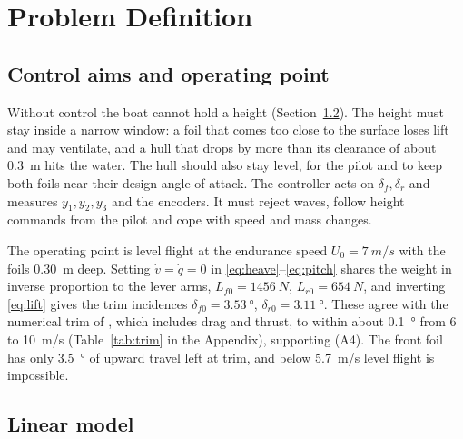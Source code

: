 \documentclass[conference]{IEEEtran}
\begin{document}
\section{Problem Definition}
\label{sec:problem}

\subsection{Control aims and operating point}

Without control the boat cannot hold a height (Section~\ref{sec:lin}). The
height must stay inside a narrow window: a foil that comes too close to the
surface loses lift and may ventilate, and a hull that drops by more than its
clearance of about \SI{0.3}{m} hits the water. The hull should also stay level,
for the pilot and to keep both foils near their design angle of attack. The
controller acts on $\delta_f,\delta_r$ and measures $y_1,y_2,y_3$ and the
encoders. It must reject waves, follow height commands from the pilot and cope
with speed and mass changes.

The operating point is level flight at the endurance speed $U_0=\SI{7}{m/s}$
\cite{belime} with the foils \SI{0.30}{m} deep. Setting
$\dot v=\dot q=0$ in \eqref{eq:heave}--\eqref{eq:pitch} shares the weight in
inverse proportion to the lever arms, $L_{f0}=\SI{1456}{N}$,
$L_{r0}=\SI{654}{N}$, and inverting \eqref{eq:lift} gives the trim incidences
$\delta_{f0}=\SI{3.53}{\degree}$, $\delta_{r0}=\SI{3.11}{\degree}$. These agree
with the numerical trim of \cite{belime}, which includes drag and thrust, to
within about \SI{0.1}{\degree} from 6 to \SI{10}{m/s} (Table~\ref{tab:trim} in the Appendix),
supporting (A4).
 The front foil
has only \SI{3.5}{\degree} of upward travel left at trim, and below
\SI{5.7}{m/s} level flight is impossible.

\subsection{Linear model}
\label{sec:lin}
\end{document}
